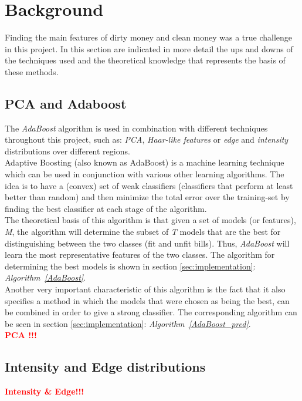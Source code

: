 \documentclass[11pt,twocolumn]{article}
\newcommand{\todo}[1]{\textcolor{red}{\textbf{#1}}}
\begin{document}
	\section{Background}\label{sec:background}
	\hspace*{10px}Finding the main features of dirty money and clean money was a true challenge in this project. In this section are indicated in more detail the ups and downs of the techniques used and the theoretical knowledge that represents the basis of these methods.
	\subsection{PCA and Adaboost}\label{sec:PCA}
	\hspace*{10px}The \emph{AdaBoost} algorithm is used in combination with different techniques throughout this project, such as: \emph{PCA}, \emph{Haar-like features} or \emph{edge} and \emph{intensity} distributions over different regions.\\
		\hspace*{10px}Adaptive Boosting (also known as AdaBoost) is a machine learning technique which can be used in conjunction with various other learning algorithms. The idea is to have a (convex) set of weak classifiers (classifiers that perform at least better than random) and then minimize the total error over the training-set by finding the best classifier at each stage of the algorithm.\\
		\hspace*{10px}The theoretical basis of this algorithm is that given a set of models (or features), \emph{M}, the algorithm will determine the subset of \emph{T} models that are the best for distinguishing between the two classes (fit and unfit bills). Thus, \emph{AdaBoost} will learn the most representative features of the two classes. The algorithm for determining the best models is shown in section \ref{sec:implementation}: \emph{Algorithm~\ref{AdaBoost}}.\\
		\hspace*{10px}Another very important characteristic of this algorithm is the fact that it also specifies a method in which the models that were chosen as being the best, can be combined in order to give a strong classifier. The corresponding algorithm can be seen in section \ref{sec:implementation}: \emph{Algorithm~\ref{AdaBoost_pred}}.\\
		\todo{\hspace*{10px}PCA !!!}
	\subsection{Intensity and Edge distributions}\label{sec:Intensity_Edge}
		\todo{\hspace*{10px}Intensity \& Edge!!!\\}
\end{document}

